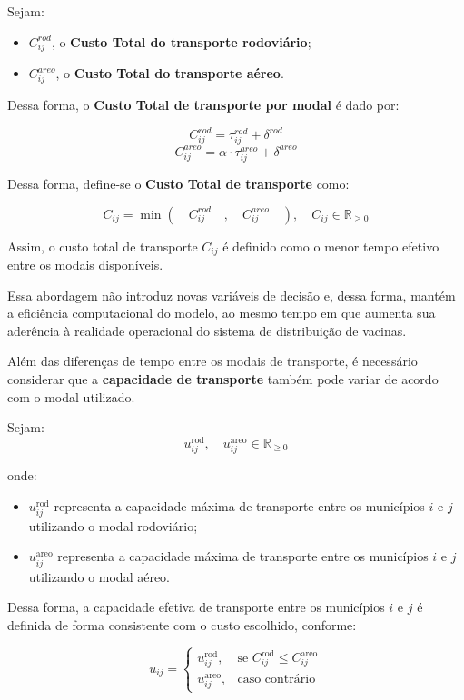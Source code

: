 Sejam:
\begin{itemize}
    \item $C_{ij}^{rod}$, o \textbf{Custo Total do transporte rodoviário};
    \item $C_{ij}^{areo}$, o \textbf{Custo Total do transporte aéreo}.
\end{itemize}


Dessa forma, o \textbf{Custo Total de transporte por modal} é dado por:

\[
C_{ij}^{rod} = \tau_{ij}^{rod} + \delta^{rod}
\]
\[
C_{ij}^{areo} = \alpha \cdot \tau_{ij}^{areo} + \delta^{areo}
\]


Dessa forma, define-se o \textbf{Custo Total de transporte} como:

\[
C_{ij} = \min \left( \quad C_{ij}^{rod} \quad , \quad C_{ij}^{areo} \quad \right),  \quad C_{ij} \in \mathbb{R}_{\geq 0}
\]

Assim, o custo total de transporte $C_{ij}$ é definido como o menor tempo efetivo entre os modais disponíveis.

Essa abordagem não introduz novas variáveis de decisão e, dessa forma, mantém a eficiência computacional do modelo, ao mesmo tempo em que aumenta sua aderência à realidade operacional do sistema de distribuição de vacinas.

Além das diferenças de tempo entre os modais de transporte, é necessário considerar que a \textbf{capacidade de transporte} também pode variar de acordo com o modal utilizado.

Sejam:
\[
u_{ij}^{\text{rod}}, \quad u_{ij}^{\text{areo}} \in \mathbb{R}_{\geq 0}
\]

onde:
\begin{itemize}
    \item $u_{ij}^{\text{rod}}$ representa a capacidade máxima de transporte entre os municípios $i$ e $j$ utilizando o modal rodoviário;
    \item $u_{ij}^{\text{areo}}$ representa a capacidade máxima de transporte entre os municípios $i$ e $j$ utilizando o modal aéreo.
\end{itemize}

Dessa forma, a capacidade efetiva de transporte entre os municípios $i$ e $j$ é definida de forma consistente com o custo escolhido, conforme:

\begin{equation}
u_{ij} =
\begin{cases}
u_{ij}^{\text{rod}}, & \text{se } C_{ij}^{\text{rod}} \le C_{ij}^{\text{areo}} \\
u_{ij}^{\text{areo}}, & \text{caso contrário}
\end{cases}
\end{equation}

